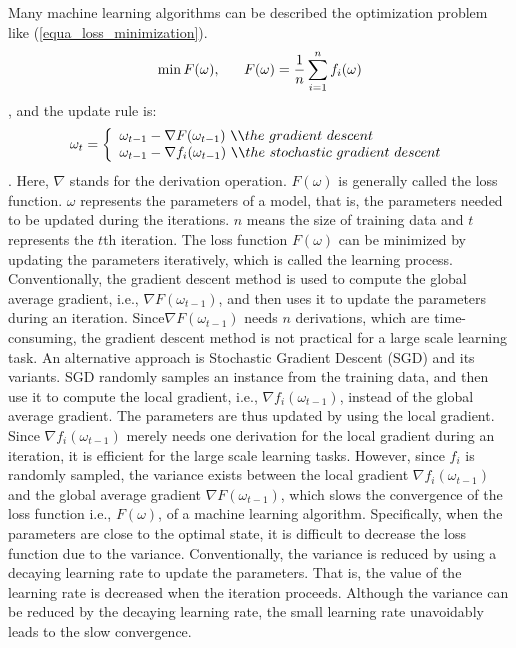 \documentclass[preprint,review,11pt,a4paper]{elsarticle}
\begin{document}
Many machine learning algorithms can be described the optimization problem like (\ref{equa_loss_minimization}).
\begin{equation}
\label{equa_loss_minimization}
\min F(\omega),~~~~~F(\omega)=\frac{1}{n}\sum\limits_{i=1}^n f_i(\omega)\\
\end{equation}, and the update rule is:
\begin{equation}
\omega_t=\left\{ \begin{array}{ll}
\omega_{t-1}-\nabla F(\omega_{t-1})$ \verb|\\|$the ~ gradient ~descent\\
\omega_{t-1}-\nabla f_i(\omega_{t-1})$ \verb|\\|$the ~stochastic ~gradient~ descent\\
\end{array} \right.
\end{equation}. Here, $\nabla$ stands for the derivation operation. $F(\omega)$ is generally called the loss function. $\omega$ represents the parameters of a model, that is, the parameters needed to be updated during the iterations. $n$ means the size of training data and $t$ represents the $t$th iteration. The loss function $F(\omega)$ can be minimized by updating the parameters iteratively, which is called the learning process. Conventionally, the gradient descent method is used to compute the global average gradient, i.e., $\nabla F(\omega_{t-1})$, and then uses it to update the parameters during an iteration. Since$\nabla F(\omega_{t-1})$ needs $n$ derivations, which are time-consuming, the gradient descent method is not practical for a large scale learning task.  An alternative approach  is Stochastic  Gradient Descent (SGD) and its variants. SGD randomly samples an instance from the training data, and then use it to compute the local gradient, i.e., $\nabla f_i(\omega_{t-1})$, instead of the global average gradient.   The parameters are thus updated by using the local gradient. Since $\nabla f_i(\omega_{t-1})$ merely needs one derivation for the local gradient during an iteration,  it is efficient for the large scale learning tasks.  However, since $f_i$ is randomly sampled, the variance exists between the local gradient $\nabla f_i(\omega_{t-1})$ and the global average gradient $\nabla F(\omega_{t-1})$, which slows the convergence of the loss function i.e., $F(\omega)$, of a machine learning algorithm.  Specifically, when the parameters are close to the optimal state, it is difficult to decrease the loss function due to the variance. Conventionally, the variance is reduced by using a decaying learning rate to update the parameters. That is,  the value of the learning rate is decreased when the iteration proceeds. Although the variance can be reduced by the decaying learning rate, the small learning rate unavoidably  leads to the slow convergence.
\end{document}
